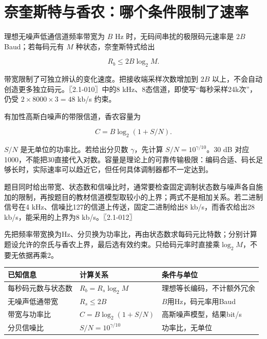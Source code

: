 \section{奈奎斯特与香农：哪个条件限制了速率}\label{CN02-02}

理想无噪声低通信道频率带宽为 \(B\) Hz 时，无码间串扰的极限码元速率是 \(2B\) Baud；若每码元有 \(M\) 种状态，奈奎斯特式给出

\[R_b\le 2B\log_2M.\]

带宽限制了可独立辨认的变化速度。把接收端采样次数增加到 \(2B\) 以上，不会自动创造更多独立码元。〖2.1-010〗中的8 kHz、8态信道，即使写``每秒采样24k次''，仍受 \(2\times8000\times3=48\) kb/s 约束。

有加性高斯白噪声的带限信道，香农容量为

\[C=B\log_2(1+S/N).\]

\(S/N\) 是无单位的功率比。若给出分贝数 \(\gamma\)，先计算 \(S/N=10^{\gamma/10}\)。30 dB 对应1000，不能把30直接代入对数。容量是理论上的可靠传输极限：编码合适、码长足够长时，实际速率可以趋近它，但任何具体调制器都不一定达到。

题目同时给出带宽、状态数和信噪比时，通常要检查固定调制状态数与噪声各自施加的限制，再按题目的教材信道模型取较小的上界；两式不是相加关系。若二进制信号在4 kHz、信噪比127的信道上传送，固定二进制给出8 kb/s，而香农给出28 kb/s，能采用的上界为8 kb/s。〖2.1-012〗

\begin{methodbox}[容量题的四步换算]

先把频率带宽换为Hz、分贝换为功率比，再由状态数求每码元比特数；分别计算题设允许的奈氏与香农上界，最后选有效约束。只给码元率时直接乘\(\log_2M\)，不要无依据再乘2。

\end{methodbox}

\begin{wideblock}

\par\medskip\noindent\begin{minipage}{\linewidth}\fontsize{9.3}{12}\selectfont\begin{tabularx}{\linewidth}{@{}YYY@{}}
\toprule\noalign{}
已知信息 & 计算关系 & 条件与单位 \\
\midrule\noalign{}


每秒码元数与状态数 & \(R_b=R_s\log_2M\) & 理想等长编码，不计额外冗余 \\
无噪声低通带宽 & \(R_s\le2B\) & \(B\)用Hz，码元率用Baud \\
带宽与功率比 & \(C=B\log_2(1+S/N)\) & 高斯噪声模型，结果bit/s \\
分贝信噪比 & \(S/N=10^{\gamma/10}\) & 功率比，无单位 \\
\bottomrule\end{tabularx}
\end{minipage}\par\medskip

\end{wideblock}


